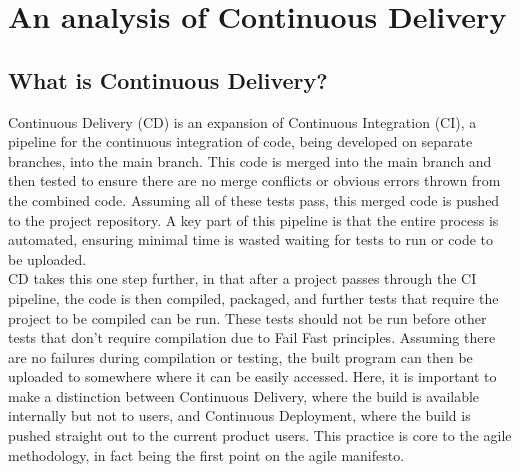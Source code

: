 \documentclass[journal]{IEEEtran}
\begin{document}
\section{An analysis of Continuous Delivery}
\subsection{What is Continuous Delivery?}
Continuous Delivery (CD) is an expansion of Continuous Integration (CI), a pipeline for the continuous integration of code, being developed on separate branches, into the main branch. This code is merged into the main branch and then tested to ensure there are no merge conflicts or obvious errors thrown from the combined code. Assuming all of these tests pass, this merged code is pushed to the project repository. A key part of this pipeline is that the entire process is automated, ensuring minimal time is wasted waiting for tests to run or code to be uploaded.\cite{ContDelIntro,CICDCD} \\
CD takes this one step further, in that after a project passes through the CI pipeline, the code is then compiled, packaged, and further tests that require the project to be compiled can be run. These tests should not be run before other tests that don't require compilation due to Fail Fast principles\cite{shore2004fail,bamboo}. Assuming there are no failures during compilation or testing, the built program can then be uploaded to somewhere where it can be easily accessed. Here, it is important to make a distinction between Continuous Delivery, where the build is available internally but not to users, and Continuous Deployment, where the build is pushed straight out to the current product users. This practice is core to the agile methodology, in fact being the first point on the agile manifesto\cite{agilemanifesto}.
\end{document}
